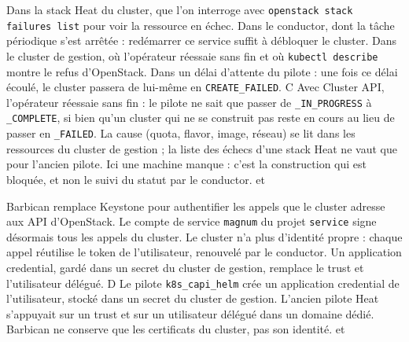   {Dans la stack Heat du cluster, que l'on interroge avec \texttt{openstack stack failures list} pour voir la ressource en échec.}
  {Dans le conductor, dont la tâche périodique s'est arrêtée : redémarrer ce service suffit à débloquer le cluster.}
  {Dans le cluster de gestion, où l'opérateur réessaie sans fin et où \texttt{kubectl describe} montre le refus d'OpenStack.}
  {Dans un délai d'attente du pilote : une fois ce délai écoulé, le cluster passera de lui-même en \texttt{CREATE\_FAILED}.}
  {C}
  {Avec Cluster API, l'opérateur réessaie sans fin : le pilote ne sait que passer de \texttt{\_IN\_PROGRESS} à \texttt{\_COMPLETE}, si bien qu'un cluster qui ne se construit pas reste en cours au lieu de passer en \texttt{\_FAILED}. La cause (quota, flavor, image, réseau) se lit dans les ressources du cluster de gestion ; la liste des échecs d'une stack Heat ne vaut que pour l'ancien pilote. Ici une machine manque : c'est la construction qui est bloquée, et non le suivi du statut par le conductor.}
  { et }

  {Barbican remplace Keystone pour authentifier les appels que le cluster adresse aux API d'OpenStack.}
  {Le compte de service \texttt{magnum} du projet \texttt{service} signe désormais tous les appels du cluster.}
  {Le cluster n'a plus d'identité propre : chaque appel réutilise le token de l'utilisateur, renouvelé par le conductor.}
  {Un application credential, gardé dans un secret du cluster de gestion, remplace le trust et l'utilisateur délégué.}
  {D}
  {Le pilote \texttt{k8s\_capi\_helm} crée un application credential de l'utilisateur, stocké dans un secret du cluster de gestion. L'ancien pilote Heat s'appuyait sur un trust et sur un utilisateur délégué dans un domaine dédié. Barbican ne conserve que les certificats du cluster, pas son identité.}
  { et }

